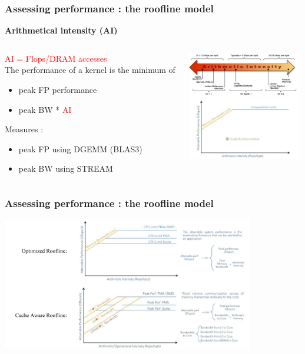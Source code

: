 \begin{frame}[containsverbatim]
\frametitle{Assessing performance : the roofline model}
\textbf{Arithmetical intensity (AI)}
\vfill
\begin{columns}[c]
	\begin{column}{5cm}
	\textcolor{red}{AI = Flops/DRAM accesses}
	\\
	The performance of a kernel is the minimum of
	\begin{itemize}
	\item peak FP performance
	\item peak BW * \textcolor{red}{AI}
	\end{itemize}
	Measures :
	\begin{itemize}
	\item peak FP using DGEMM (BLAS3)
	\item peak BW using STREAM
	\end{itemize}

	\end{column} 
	\begin{column}{5cm}
	\includegraphics[width=5cm]{DayGilles/images/ai.jpg}
	\end{column}
\end{columns} 
\end{frame}


\begin{frame}[containsverbatim]
\frametitle{Assessing performance : the roofline model}
\begin{center}
\includegraphics[width=11cm]{DayGilles/images/roofline.jpg}
\end{center}
\end{frame}



